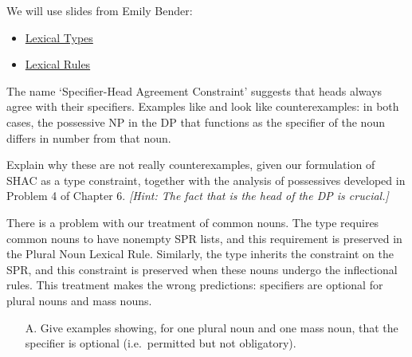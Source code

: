 \documentclass[a4paper,landscape,headrule,footrule]{foils}
\begin{document}
\avmfont{\it}

\maketitle



We will use slides from Emily Bender:


\begin{itemize}
\item \href{ch08a-uw.pdf}{Lexical Types}
\item \href{ch08a-uw.pdf}{Lexical Rules}
\end{itemize}



The name `Specifier-Head Agreement Constraint' suggests that heads
always agree with their specifiers.  Examples like 
and  look like counterexamples:  in both
cases, the possessive NP in the DP that functions as the specifier of
the noun differs in number from that noun.

Explain why these are not really counterexamples, given our
formulation of SHAC as a type constraint, together with the analysis
of possessives developed in Problem 4 of Chapter 6.  {\sl [Hint: The
  fact that  is the head of the DP is crucial.]}


There is a problem with our treatment of  common nouns.  
The type   requires common nouns to have nonempty SPR lists, and this
requirement is preserved in the  Plural Noun Lexical Rule.
Similarly, the type  inherits the constraint on the SPR,
and this constraint is preserved when these nouns undergo the inflectional
rules.
This treatment makes the wrong predictions:
specifiers are optional for plural nouns and mass nouns.
\begin{itemize}
\item[A.] 
Give examples showing, for one plural noun 
and one  mass noun, that
the specifier is optional (i.e.\ permitted but not obligatory).
\end{itemize}
\end{document}
